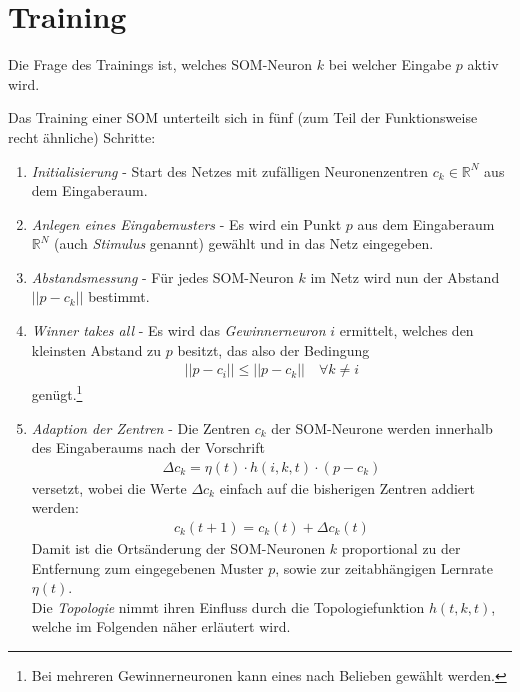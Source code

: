 \section*{Training}
Die Frage des Trainings ist, welches SOM-Neuron $k$ bei welcher Eingabe $p$ aktiv wird.

Das Training einer SOM unterteilt sich in fünf (zum Teil der Funktionsweise recht ähnliche) Schritte:

\begin{enumerate}
	\item \emph{Initialisierung} - Start des Netzes mit zufälligen Neuronenzentren $c_k \in \mathbb{R}^N$ aus dem Eingaberaum.
	\item \emph{Anlegen eines Eingabemusters} - Es wird ein Punkt $p$ aus dem Eingaberaum $\mathbb{R}^N$ (auch \emph{Stimulus} genannt) gewählt und in das Netz eingegeben.
	\item \emph{Abstandsmessung} - Für jedes SOM-Neuron $k$ im Netz wird nun der Abstand $||p - c_k||$ bestimmt.
	\item \emph{Winner takes all} - Es wird das \emph{Gewinnerneuron} $i$ ermittelt, welches den kleinsten Abstand zu $p$ besitzt, das also der Bedingung
	\begin{align*}
		||p - c_i|| \le ||p - c_k|| \quad \forall k \ne i
	\end{align*}
	\noindent
	genügt.\footnote{Bei mehreren Gewinnerneuronen kann eines nach Belieben gewählt werden.}
	\item \emph{Adaption der Zentren} - Die Zentren $c_k$ der SOM-Neurone werden innerhalb des Eingaberaums nach der Vorschrift
	\begin{align*}
		\Delta c_k = \eta(t) \cdot h(i,k,t) \cdot (p-c_k)
	\end{align*}
	\noindent
	versetzt, wobei die Werte $\Delta c_k$ einfach auf die bisherigen Zentren addiert werden:
	\begin{align*}
		c_k(t+1) = c_k(t) + \Delta c_k(t)
	\end{align*}
	\noindent
	Damit ist die Ortsänderung der SOM-Neuronen $k$ proportional zu der Entfernung zum eingegebenen Muster $p$, sowie zur zeitabhängigen Lernrate $\eta(t)$.\\
	Die \emph{Topologie} nimmt ihren Einfluss durch die Topologiefunktion $h(t,k,t)$, welche im Folgenden näher erläutert wird.
\end{enumerate}

